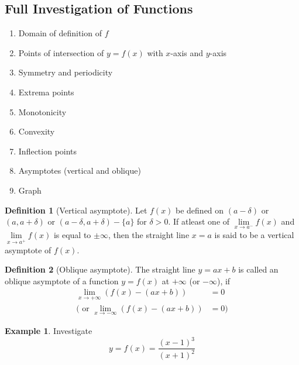 \documentclass[fleqn, a4paper, 10pt]{article}
\theoremstyle{definition}
\newtheorem{example}{Example}
\newtheorem{definition}{Definition}
\theoremstyle{theorem}
\theoremstyle{remark}
\begin{document}
\begin{multicols}{2}
\section{Full Investigation of Functions}

\begin{enumerate}
	\item Domain of definition of $f$
	\item Points of intersection of $y = f(x)$ with $x$-axis and $y$-axis
	\item Symmetry and periodicity
	\item Extrema points
	\item Monotonicity
	\item Convexity
	\item Inflection points
	\item Asymptotes (vertical and oblique)
	\item Graph
\end{enumerate}

\begin{definition}[Vertical asymptote]
	Let $f(x)$ be defined on $(a - \delta)$ or $(a, a + \delta)$ or $(a - \delta, a + \delta) - \{a\}$ for $\delta > 0$. If atleast one of $\lim\limits_{x \to a^-} f(x)$ and $\lim\limits_{x \to a^+} f(x)$ is equal to $\pm \infty$, then the straight line $x = a$ is said to be a vertical asymptote of $f(x)$.
\end{definition}

\begin{definition}[Oblique asymptote]
	The straight line $y = ax + b$ is called an oblique asymptote of a function $y = f(x)$ at $+ \infty$ (or $- \infty$), if 
	\begin{align*}
		\lim\limits_{x \to + \infty} (f(x) - (ax+b)) &= 0 \\
		\Big( \text{ or } \lim\limits_{x \to -\infty} (f(x) - (ax+b)) &= 0 \Big)
	\end{align*}
\end{definition}

\begin{example}
	Investigate
	\begin{equation*}
	y = f(x) =\dfrac{(x-1)^3}{(x+1)^2}
	\end{equation*}
\end{example}


\end{multicols}
\end{document}
